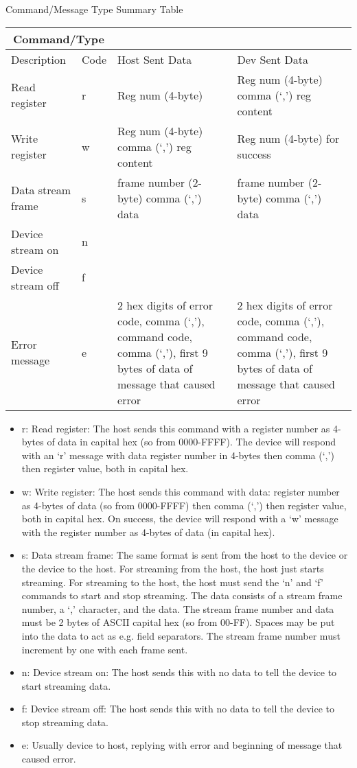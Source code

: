 \documentclass{customdocclass}
\begin{document}
\begin{center}
\small
Command/Message Type Summary Table
\begin{tabularx}{\textwidth}{|X|l|X|X|} \hline
\multicolumn{2}{|c|}{Command/Type} & & \\ \hline
Description & Code & Host Sent Data & Dev Sent Data \\ \hline
Read register & r & Reg num (4-byte) & Reg num (4-byte) comma (`,') reg content \\ \hline
Write register & w & Reg num (4-byte) comma (`,') reg content & Reg num (4-byte) for success \\ \hline
Data stream frame & s & frame number (2-byte) comma (`,') data &  frame number (2-byte) comma (`,') data \\ \hline
Device stream on & n & & \\ \hline
Device stream off & f & & \\ \hline
Error message & e & 2 hex digits of error code, comma (`,'), command code, comma (`,'), first 9 bytes of data of message that caused error & 2 hex digits of error code, comma (`,'), command code, comma (`,'), first 9 bytes of data of message that caused error \\ \hline
\end{tabularx}
\end{center}

\begin{itemize}
  \item r: Read register: The host sends this command with a register number as 4-bytes of data in capital hex (so from 0000-FFFF). The device will respond with an `r' message with data register number in 4-bytes then comma (`,') then register value, both in capital hex.
  \item w: Write register: The host sends this command with data: register number as 4-bytes of data (so from 0000-FFFF) then comma (`,') then register value, both in capital hex. On success, the device will respond with a `w' message with the register number as 4-bytes of data (in capital hex).
  \item s: Data stream frame: The same format is sent from the host to the device or the device to the host. For streaming from the host, the host just starts streaming. For streaming to the host, the host must send the `n' and `f' commands to start and stop streaming. The data consists of a stream frame number, a `,' character, and the data. The stream frame number and data must be 2 bytes of ASCII capital hex (so from 00-FF). Spaces may be put into the data to act as e.g. field separators. The stream frame number must increment by one with each frame sent.
  \item n: Device stream on: The host sends this with no data to tell the device to start streaming data.
  \item f: Device stream off: The host sends this with no data to tell the device to stop streaming data.
  \item e: Usually device to host, replying with error and beginning of message that caused error.
\end{itemize}
\end{document}
